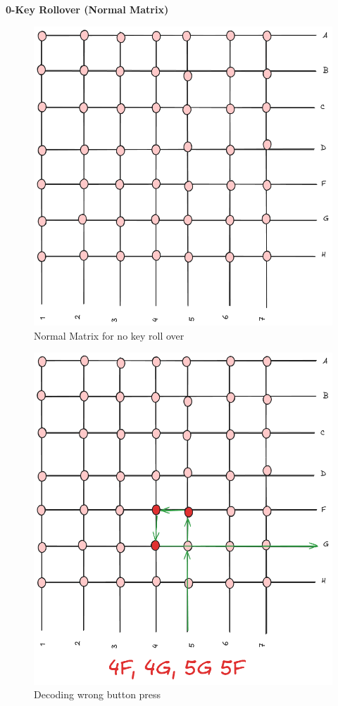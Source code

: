 \documentclass[a4paper,11pt]{article}%
\begin{document}
\textbf{0-Key Rollover (Normal Matrix)}
\begin{figure}[H]
	\centering
	\includegraphics[scale=0.6]{figures/NRO.png}
	\caption{Normal Matrix for no key roll over}
\end{figure}
\begin{figure}[H]
	\centering
	\includegraphics[scale=0.6]{figures/nkr-EX.png}
	\caption{Decoding wrong button press}
\end{figure}
\end{document}
